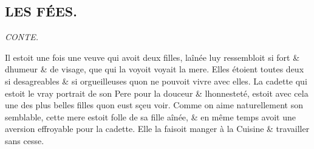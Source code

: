 \documentclass[14pt,a4paper]{memoir}
\begin{document}
\begin{otherlanguage}{french}
\section{LES FÉES.}

\emph{CONTE.}

Il estoit une fois une veuve qui avoit deux filles,
l\textquotesingle aînée luy ressembloit si fort \&
d\textquotesingle humeur \& de visage, que qui la voyoit voyait la mere.
Elles étoient toutes deux si desagreables \& si orgueilleuses
qu\textquotesingle on ne pouvoit vivre avec elles. La cadette qui estoit
le vray portrait de son Pere pour la douceur \&
l\textquotesingle honnesteté, estoit avec cela une des plus belles
filles qu\textquotesingle on eust sçeu voir. Comme on aime naturellement
son semblable, cette mere estoit folle de sa fille aînée, \& en même
temps avoit une aversion effroyable pour la cadette. Elle la faisoit
manger à la Cuisine \& travailler sans cesse.


\end{otherlanguage}
\end{document}
